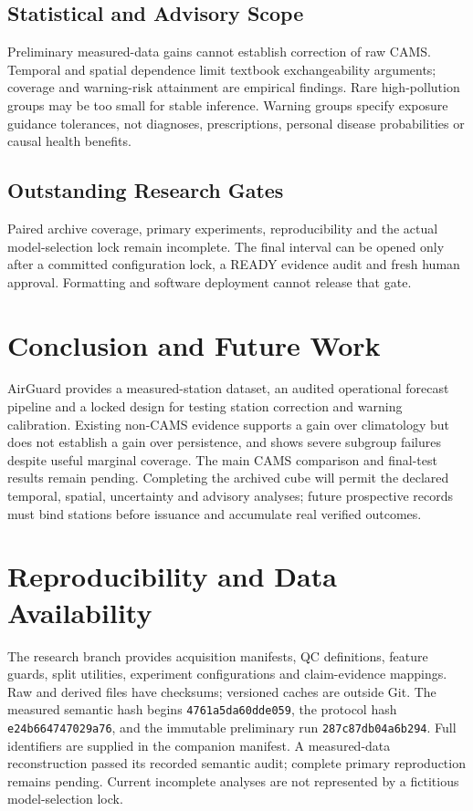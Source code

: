 \documentclass[journal]{IEEEtran}
\begin{document}
\subsection{Statistical and Advisory Scope}
Preliminary measured-data gains cannot establish correction of raw CAMS.
Temporal and spatial dependence limit textbook exchangeability arguments;
coverage and warning-risk attainment are empirical findings. Rare high-pollution
groups may be too small for stable inference. Warning groups specify exposure
guidance tolerances, not diagnoses, prescriptions, personal disease probabilities
or causal health benefits.

\subsection{Outstanding Research Gates}
Paired archive coverage, primary experiments, reproducibility and the actual
model-selection lock remain incomplete. The final interval can be opened only
after a committed configuration lock, a READY evidence audit and fresh human
approval. Formatting and software deployment cannot release that gate.

\section{Conclusion and Future Work}
AirGuard provides a measured-station dataset, an audited operational forecast
pipeline and a locked design for testing station correction and warning
calibration. Existing non-CAMS evidence supports a gain over climatology but
does not establish a gain over persistence, and shows severe subgroup failures
despite useful marginal coverage. The main CAMS comparison and final-test
results remain pending. Completing the archived cube will permit the declared
temporal, spatial, uncertainty and advisory analyses; future prospective records
must bind stations before issuance and accumulate real verified outcomes.

\section{Reproducibility and Data Availability}
The research branch provides acquisition manifests, QC definitions, feature
guards, split utilities, experiment configurations and claim-evidence mappings.
Raw and derived files have checksums; versioned caches are outside Git.
The measured semantic hash begins \texttt{4761a5da60dde059}, the protocol hash
\texttt{e24b664747029a76}, and the immutable preliminary run
\texttt{287c87db04a6b294}. Full identifiers are supplied in the companion manifest.
A measured-data reconstruction passed its recorded semantic audit; complete
primary reproduction remains pending. Current incomplete analyses are not
represented by a fictitious model-selection lock.
\end{document}

